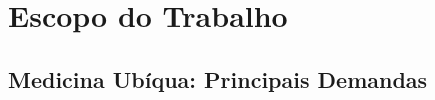 \documentclass[ppginf, pep]{esinucpel}
\begin{document}
%
%


\chapter{Escopo do Trabalho}

\section{Medicina Ubíqua: Principais Demandas}
\end{document}
